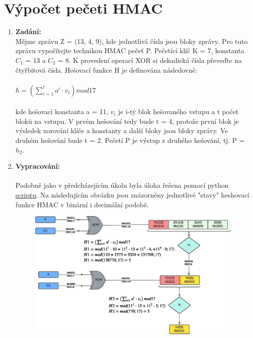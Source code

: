 \documentclass[10pt, a4paper]{article}%
\begin{document}
	\section*{\large{\textbf{Výpočet pečeti HMAC}}}
		\begin{enumerate}
			\item \textbf{Zadání:}\\
				Mějme zprávu Z = (13, 4, 9), kde jednotlivá čísla jsou bloky zprávy. Pro tuto zprávu vypočítejte
				technikou HMAC pečeť P. Pečetící klíč K = 7, konstanta $C_1$ = 13 a $C_2$ = 8. K provedení operací
				XOR si dekadická čísla převeďte na čtyřbitová čísla. Hešovací funkce H je definována následovně:\\\\
				$h = \left( \sum_{i = 1}^{t}  a^i \cdot v_i \right) mod 17$\\\\
				kde hešovací konstanta a = 11, $v_i$ je i-tý blok hešovaného vstupu a t počet bloků na vstupu. V prvém
				hešování tedy bude t = 4, protože první blok je výsledek xorování klíče a konstanty a další bloky
				jsou bloky zprávy. Ve druhém hešování bude t = 2. Pečetí P je výstup z druhého hešování, tj. P = $h_2$.
				\item \textbf{Vypracování:}\\\\
				Podobně jako v předcházejícím úkolu byla úloha řešena pomocí python
				\href{https://github.com/FilipPaul/ctvrtak_letni_semestr/blob/main/MKC_NSB/ukol1_kryptografie/README.md}{\color{blue} scriptu}.
				Na následujícím obrázku jsou znázorněny jednotlivé "stavy" heshovací funkce HMAC v binární i decimální podobě.
				\begin{figure}[ht!]
					\centering
					\includegraphics[width = 1\textwidth]{HMAC_drawing.eps}
				\end{figure}
		\end{enumerate}
	\clearpage
\end{document}
